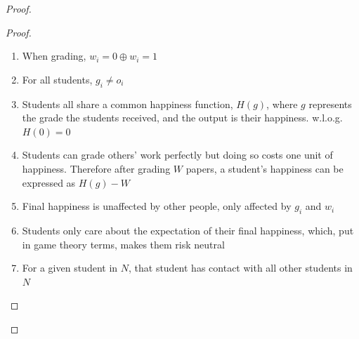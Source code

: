 \documentclass[12pt, Arial]{article}
\begin{document}
\begin{proof}
\begin{proof}
\begin{enumerate}[itemsep=0pt, parsep=0pt]
\item When grading, $w_i=0 \oplus w_i=1$
\item For all students, $g_i \neq o_i$
\item Students all share a common happiness function, $H(g)$, where $g$ represents the grade the students received, and the output is their happiness. w.l.o.g. $H(0)=0$
\item Students can grade others' work perfectly but doing so costs one unit of happiness. Therefore after grading $W$ papers, a student's happiness can be expressed as $H(g)-W$
\item Final happiness is unaffected by other people, only affected by $g_i$ and $w_i$
\item Students only care about the expectation of their final happiness, which, put in game theory terms, makes them risk neutral
\item For a given student in $N$, that student has contact with all other students in $N$
\end{enumerate}
\newpage

\end{proof}
\end{proof}
\end{document}
